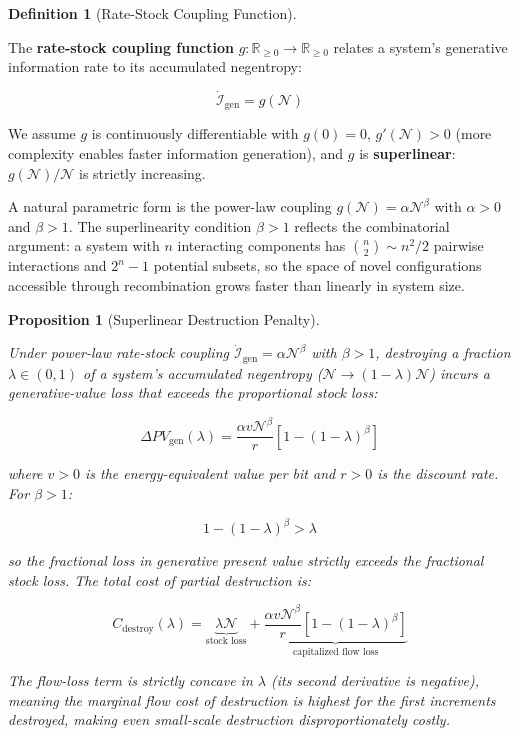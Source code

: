\documentclass[11pt]{article}
\theoremstyle{plain}
\newtheorem{proposition}[theorem]{Proposition}
\theoremstyle{definition}
\newtheorem{definition}{Definition}
\theoremstyle{remark}
\begin{document}
\begin{definition}[Rate-Stock Coupling Function]
\label{def-rate-stock-coupling}

The \textbf{rate-stock coupling function} $g: \mathbb{R}_{\geq 0} \to \mathbb{R}_{\geq 0}$ relates a system's generative information rate to its accumulated negentropy:

$$\dot{\mathcal{I}}_{\text{gen}} = g(\mathcal{N})$$

We assume $g$ is continuously differentiable with $g(0) = 0$, $g'(\mathcal{N}) > 0$ (more complexity enables faster information generation), and $g$ is \textbf{superlinear}: $g(\mathcal{N})/\mathcal{N}$ is strictly increasing.

A natural parametric form is the power-law coupling $g(\mathcal{N}) = \alpha \mathcal{N}^\beta$ with $\alpha > 0$ and $\beta > 1$. The superlinearity condition $\beta > 1$ reflects the combinatorial argument: a system with $n$ interacting components has $\binom{n}{2} \sim n^2/2$ pairwise interactions and $2^n - 1$ potential subsets, so the space of novel configurations accessible through recombination grows faster than linearly in system size.
\end{definition}

\begin{proposition}[Superlinear Destruction Penalty]
\label{prop-superlinear-destruction-penalty}

Under power-law rate-stock coupling $\dot{\mathcal{I}}_{\text{gen}} = \alpha \mathcal{N}^\beta$ with $\beta > 1$, destroying a fraction $\lambda \in (0, 1)$ of a system's accumulated negentropy ($\mathcal{N} \to (1-\lambda)\mathcal{N}$) incurs a generative-value loss that exceeds the proportional stock loss:

$$\Delta PV_{\text{gen}}(\lambda) = \frac{\alpha v \mathcal{N}^\beta}{r}\left[1 - (1-\lambda)^\beta\right]$$

where $v > 0$ is the energy-equivalent value per bit and $r > 0$ is the discount rate. For $\beta > 1$:

$$1 - (1-\lambda)^\beta > \lambda$$

so the fractional loss in generative present value strictly exceeds the fractional stock loss. The total cost of partial destruction is:

$$C_{\text{destroy}}(\lambda) = \underbrace{\lambda \mathcal{N}}_{\text{stock loss}} + \underbrace{\frac{\alpha v \mathcal{N}^\beta}{r}\left[1 - (1-\lambda)^\beta\right]}_{\text{capitalized flow loss}}$$

The flow-loss term is strictly concave in $\lambda$ (its second derivative is negative), meaning the marginal flow cost of destruction is highest for the first increments destroyed, making even small-scale destruction disproportionately costly.
\end{proposition}
\end{document}
